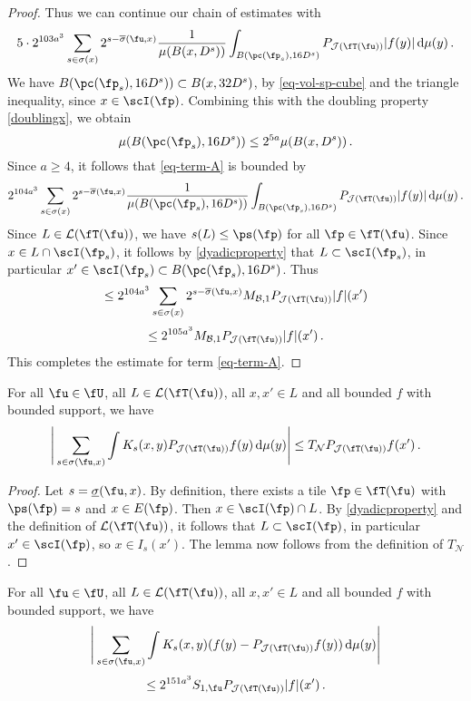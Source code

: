 \begin{proof}
    Thus we can continue our chain of estimates with
    $$
        5\cdot 2^{103a^3} \sum_{s\in\sigma(x)}2^{s - \overline{\sigma}(\fu, x)} \frac{1}{\mu(B(x,D^s))}\int_{B(\pc(\fp_s),16 D^s)}P_{\mathcal{J}(\fT(\fu))}|f(y)|\,\mathrm{d}\mu(y)\,.
    $$
    We have $B(\pc(\fp_s), 16D^s)) \subset B(x, 32D^s)$, by \eqref{eq-vol-sp-cube} and the triangle inequality, since $x \in \scI(\fp)$. Combining this with the doubling property \eqref{doublingx}, we obtain
    $$
        \mu(B(\pc(\fp_s), 16D^s)) \le 2^{5a} \mu(B(x, D^s))\,.
    $$
    Since $a \ge 4$, it follows that \eqref{eq-term-A} is bounded by
    $$
        2^{104a^3} \sum_{s\in\sigma(x)}2^{s - \overline{\sigma}(\fu, x)} \frac{1}{\mu(B(\pc(\fp_s),16D^s))}\int_{B(\pc(\fp_s),16D^s)}P_{\mathcal{J}(\fT(\fu))}|f(y)|\,\mathrm{d}\mu(y)\,.
    $$
    Since $L \in \mathcal{L}(\fT(\fu))$, we have $s(L) \le \ps(\fp)$ for all $\fp \in \fT(\fu)$. Since $x\in L \cap \scI(\fp_s)$, it follows by \eqref{dyadicproperty} that $L \subset \scI(\fp_s)$, in particular $x' \in \scI(\fp_s) \subset B(\pc(\fp_s), 16D^s)$. Thus
    $$
        \le 2^{104a^3} \sum_{s\in\sigma(x)}2^{s - \overline{\sigma}(\fu, x)} M_{\mathcal{B}, 1}P_{\mathcal{J}(\fT(\fu))}|f|(x')
    $$
    $$
        \le 2^{105a^3} M_{\mathcal{B}, 1}P_{\mathcal{J}(\fT(\fu))}|f|(x')\,.
    $$
    This completes the estimate for term \eqref{eq-term-A}.
\end{proof}

\begin{lemma}
    \label{second-tree-pointwise}
    For all $\fu \in \fU$, all $L \in \mathcal{L}(\fT(\fu))$, all $x, x' \in L$ and all bounded $f$ with bounded support, we have
    $$
         \Bigg| \sum_{s \in \sigma(\fu, x)} \int K_s(x,y) P_{\mathcal{J}(\fT(\fu))} f(y) \, \mathrm{d}\mu(y) \Bigg| \le T_{\mathcal{N}} P_{\mathcal{J}(\fT(\fu))} f(x')\,.
    $$
\end{lemma}

\begin{proof}
    Let $s = \underline{\sigma}(\fu, x)$. By definition, there exists a tile $\fp \in \fT(\fu)$ with $\ps(\fp) = s$ and $x \in E(\fp)$. Then $x \in \scI(\fp) \cap L$. By \eqref{dyadicproperty} and the definition of $\mathcal{L}(\fT(\fu))$, it follows that $L \subset \scI(\fp)$, in particular $x' \in \scI(\fp)$, so $x \in I_s(x')$.
    The lemma now follows from the definition of $T_{\mathcal{N}}$.
\end{proof}

\begin{lemma}
    \label{third-tree-pointwise}
    For all $\fu \in \fU$, all $L \in \mathcal{L}(\fT(\fu))$, all $x, x' \in L$ and all bounded $f$ with bounded support, we have
    \begin{equation*}
        \Bigg| \sum_{s \in \sigma(\fu, x)} \int K_s(x,y) (f(y) - P_{\mathcal{J}(\fT(\fu))} f(y)) \, \mathrm{d}\mu(y) \Bigg|
    \end{equation*}
    \begin{equation*}
          \le 2^{151a^3} S_{1,\fu} P_{\mathcal{J}(\fT(\fu))}|f|(x')\,.
    \end{equation*}
\end{lemma}

